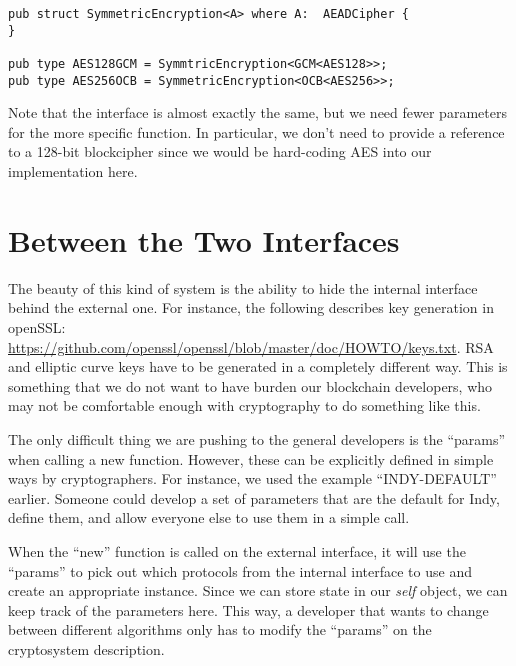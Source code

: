 \documentclass[letterpaper,11pt]{article}
\begin{document}
\begin{verbatim}
pub struct SymmetricEncryption<A> where A:  AEADCipher {
}

pub type AES128GCM = SymmtricEncryption<GCM<AES128>>;
pub type AES256OCB = SymmetricEncryption<OCB<AES256>>;
\end{verbatim}

Note that the interface is almost exactly the same, but we need fewer parameters for the more specific function.  In particular, we don't need to provide a reference to a 128-bit blockcipher since we would be hard-coding AES into our implementation here.

\section{Between the Two Interfaces}
The beauty of this kind of system is the ability to hide the internal interface behind the external one.  For instance, the following describes key generation in openSSL:  \url{https://github.com/openssl/openssl/blob/master/doc/HOWTO/keys.txt}.  RSA and elliptic curve keys have to be generated in a completely different way.  This is something that we do not want to have burden our blockchain developers, who may not be comfortable enough with cryptography to do something like this.

The only difficult thing we are pushing to the general developers is the ``params'' when calling a new function.  However, these can be explicitly defined in simple ways by cryptographers.  For instance, we used the example ``INDY-DEFAULT'' earlier.  Someone could develop a set of parameters that are the default for Indy, define them, and allow everyone else to use them in a simple call.

When the ``new'' function is called on the external interface, it will use the ``params'' to pick out which protocols from the internal interface to use and create an appropriate instance.  Since we can store state in our \emph{self} object, we can keep track of the parameters here.  This way, a developer that wants to change between different algorithms only has to modify the ``params'' on the cryptosystem description. 
\end{document}
